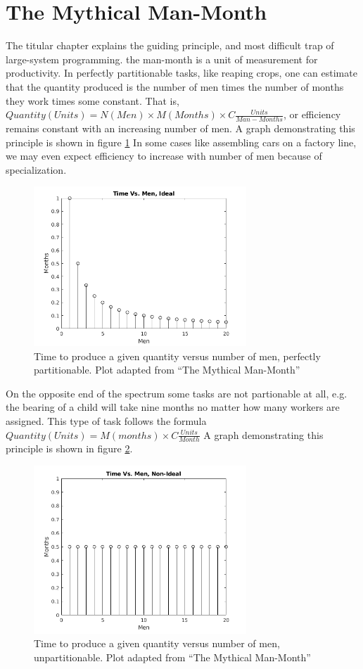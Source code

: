 \section{The Mythical Man-Month}
The titular chapter explains the guiding principle, and most difficult trap of large-system programming.  the man-month is a unit of measurement for productivity.  In perfectly partitionable tasks, like reaping crops, one can estimate that the quantity produced is the number of men times the number of months they work times some constant.  That is, $Quantity(Units) = N(Men) \times M(Months) \times C \frac{Units}{Man-Months}$, or efficiency remains constant with an increasing number of men.  A graph demonstrating this principle is shown in figure \ref{fig:ideal}  In some cases like assembling cars on a factory line, we may even expect efficiency to increase with number of men because of specialization.

\begin{figure}
\includegraphics[width=8cm]{idealmanmonth}
\centering
\caption{Time to produce a given quantity versus number of men, perfectly partitionable.  Plot adapted from ``The Mythical Man-Month''}
\label{fig:ideal}
\end{figure}

On the opposite end of the spectrum some tasks are not partionable at all, e.g. the bearing of a child will take nine months no matter how many workers are assigned.  This type of task follows the formula $Quantity(Units) = M(months) \times C \frac{Units}{Month}$  A graph demonstrating this principle is shown in figure \ref{fig:bad}.

\begin{figure}
\includegraphics[width=8cm]{badmanmonth}
\centering
\caption{Time to produce a given quantity versus number of men, unpartitionable.  Plot adapted from ``The Mythical Man-Month''}
\label{fig:bad}
\end{figure}

